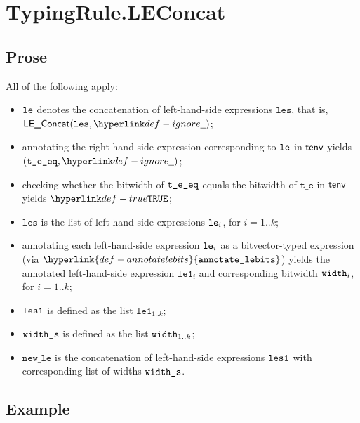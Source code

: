\documentclass{book}
\newcommand\ProseOrTypeError[0]{\ProseTerminateAs{\TypeErrorConfig}}
\newcommand\annotatelebits[0]{\hyperlink{def-annotatelebits}{\texttt{annotate\_lebits}}}
\newcommand\vte[0]{\texttt{t\_e}}
\newcommand\vleone[0]{\texttt{le1}}
\newcommand\newle[0]{\texttt{new\_le}}
\newcommand\les[0]{\texttt{les}}
\begin{document}

\section{TypingRule.LEConcat \label{sec:TypingRule.LEConcat}}

\subsection{Prose}
All of the following apply:
\begin{itemize}
  \item $\texttt{le}$ denotes the concatenation of left-hand-side expressions $\les$, that is, \\ $\LEConcat(\les, \Ignore)$;
  \item annotating the right-hand-side expression corresponding to $\texttt{le}$ in $\textsf{tenv}$ yields \\ $(\vteeq, \Ignore)$\ProseOrTypeError;
  \item checking whether the bitwidth of $\texttt{t\_e\_eq}$ equals the bitwidth of $\vte$ in $\textsf{tenv}$ yields $\True$\ProseOrTypeError;
  \item $\les$ is the list of left-hand-side expressions $\texttt{le}_i$, for $i=1..k$;
  \item annotating each left-hand-side expression $\texttt{le}_i$ as a bitvector-typed expression (via $\annotatelebits$)
        yields the annotated left-hand-side expression $\vleone_i$ and corresponding bitwidth $\texttt{width}_i$, for $i=1..k$;
  \item $\texttt{les1}$ is defined as the list $\vleone_{1..k}$;
  \item $\texttt{width\_s}$ is defined as the list $\texttt{width}_{1..k}$;
  \item $\newle$ is the concatenation of left-hand-side expressions $\texttt{les1}$ with corresponding list of widths $\texttt{width\_s}$.
\end{itemize}

\subsection{Example}

\end{document}
